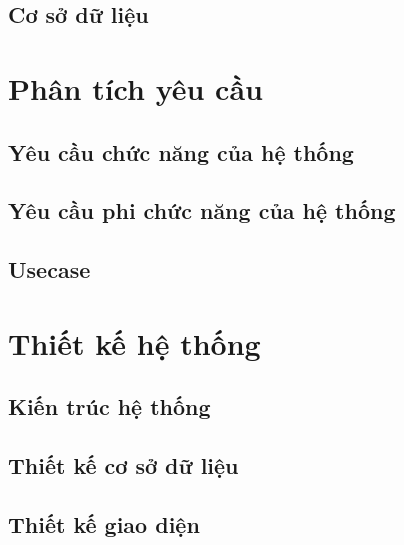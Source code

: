 \documentclass[a4paper,12pt,fleqn,print,oneside]{extarticle}
\begin{document}
\subsection{Cơ sở dữ liệu}




\newpage
\section{Phân tích yêu cầu}

\subsection{Yêu cầu chức năng của hệ thống}


\subsection{Yêu cầu phi chức năng của hệ thống}


\subsection{Usecase}






\newpage
\section{Thiết kế hệ thống}

\subsection{Kiến trúc hệ thống}


\newpage
\subsection{Thiết kế cơ sở dữ liệu}




\subsection{Thiết kế giao diện}

\end{document}
